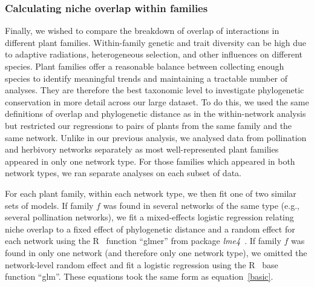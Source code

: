 \documentclass[12pt]{article}
\begin{document}
\begin{spacing}{1.5}


  \subsubsection*{Calculating niche overlap within families}


    Finally, we wished to compare the breakdown of overlap of interactions in
    different plant families.
    Within-family genetic and trait diversity can be high due to adaptive radiations, heterogeneous selection, and other influences on different species. Plant families offer a reasonable balance between collecting enough species to identify meaningful trends and maintaining a tractable number of analyses. They are therefore the best taxonomic level to investigate phylogenetic conservation in more detail across our large dataset.
     To do this, we used the same definitions of 
    overlap and phylogenetic distance as in the within-network analysis but 
    restricted our regressions to pairs of plants from the same family and 
    the same network. Unlike in our previous analysis, we analysed data from 
    pollination and herbivory networks separately as most well-represented 
    plant families appeared in only one network type. For those families 
    which appeared in both network types, we ran separate analyses on each 
    subset of data.


    For each plant family, within each network type, we then fit one of two 
    similar sets of models. If family $f$ was found in several networks of 
    the same type (e.g., several pollination networks), we fit a 
    mixed-effects logistic regression relating niche overlap to a fixed 
    effect of phylogenetic distance and a random effect for each network 
    using the R~\citep{R} function ``glmer'' from package
     \emph{lme4}~\citep{lme4}. If family $f$ was found in only one network
    (and therefore only one network type), we omitted the 
    network-level random effect and fit a logistic regression using the 
    R~\citep{R} base function ``glm''. These equations took the same form as equation~\ref{basic}.



\end{spacing}
\end{document}
